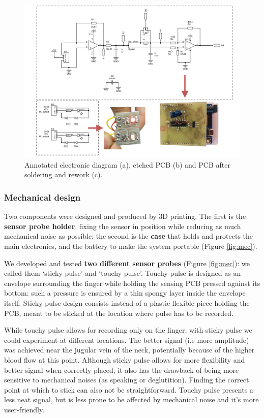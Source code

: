 \documentclass[conference]{IEEEtran}
\begin{document}
      \begin{figure}[t]
         \centering
         \includegraphics[width=\linewidth]{images/ed2.png}
         \caption{Annotated electronic diagram (a), etched PCB (b) and PCB after soldering and rework (c).}
         \label{fig:ed2}
      \end{figure}
      \subsubsection{Mechanical design}

      Two components were designed and produced by 3D printing. The first is the \textbf{sensor probe holder}, fixing the sensor in position while reducing  as much mechanical noise as possible; the second is the \textbf{case} that holds and protects the main electronics, and the battery to make the system portable (Figure \ref{fig:mec}). 

      We developed and tested \textbf{two different sensor probes} (Figure \ref{fig:mec}): we called them `sticky pulse’ and `touchy pulse’.  Touchy pulse is designed as an envelope surrounding the finger while holding the sensing PCB pressed against its bottom: such a  pressure is ensured by a thin spongy layer inside the envelope itself.
      Sticky pulse design consists instead of a plastic flexible piece holding the PCB, meant to be sticked at the location where pulse has to be recorded. 
      
      While touchy pulse allows for recording only on the finger, with sticky pulse we could experiment at different locations. The better signal (i.e more amplitude) was achieved near the jugular vein of the neck, potentially because of the higher blood flow at this point. Although sticky pulse allows for more flexibility and better signal when correctly placed, it also has the drawback of being more sensitive to mechanical noises (as speaking or deglutition). Finding the correct point at which to stick can also not be straightforward. Touchy pulse presents a less neat signal, but is less prone to be affected by mechanical noise and it’s more user-friendly. 
      
\end{document}
